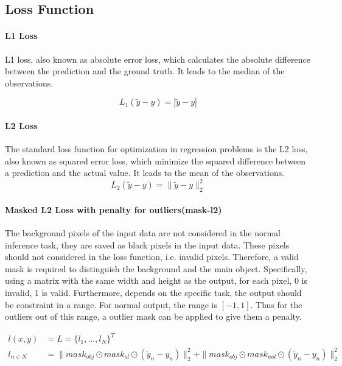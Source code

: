 \documentclass[border=15pt, multi, tikz]{article}
\begin{document}
\subsection{Loss Function}

\paragraph{L1 Loss}
L1 loss, also known as absolute error loss, which calculates the absolute difference between the prediction and the ground truth. It leads to the median of the observations.

\[ L_1(\tilde y - y) = |\tilde y - y | \]

\paragraph{L2 Loss}
The standard loss function for optimization in regression problems is the L2 loss, also known as squared error loss, which minimize the squared difference between a prediction and the actual value. It leads to the mean of the observations. 
\[ L_2(\tilde y - y) = \|\tilde y - y \|_2^2 \]


\paragraph{Masked L2 Loss with penalty for outliers(mask-l2)}
\label{par:maskl2}
The background pixels of the input data are not considered in the normal inference task, they are saved as black pixels in the input data. These pixels should not considered in the loss function, i.e. invalid pixels. Therefore, a valid mask is required to distinguish the background and the main object. Specifically, using a matrix with the same width and height as the output, for each pixel, 0 is invalid, 1 is valid. 
Furthermore, depends on the specific task, the output should be constraint in a range. For normal output, the range is $ [-1,1] $. Thus for the outliers out of this range, a outlier mask can be applied to give them a penalty.

\begin{equation}\label{gcnn-loss}
	\begin{array}{ll}
		l(x,y)&= L  = \{l_1, ..., l_N\}^T\\ 
		l_{n\in N} &= \| mask_{obj} \odot mask_{ol} \odot ( {\tilde y}_n - y_n) \|_2^2 + 	\| mask_{obj} \odot mask_{nol} \odot ( {\tilde y}_n - y_n) \|_2^2 \\
	\end{array}
\end{equation}
\end{document}
